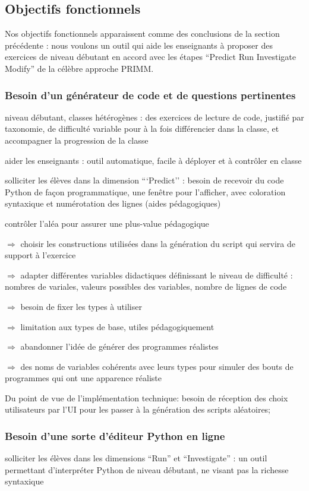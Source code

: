 \documentclass[11pt,a4paper]{article}
\begin{document}
\subsection{Objectifs fonctionnels}
Nos objectifs fonctionnels apparaissent comme des conclusions de la section précédente : nous voulons un outil qui aide les enseignants à proposer des exercices de niveau débutant en accord avec les étapes ``Predict Run Investigate Modify'' de la célèbre approche PRIMM.

\subsubsection{Besoin d'un générateur de code et de questions pertinentes}

niveau débutant, classes hétérogènes : des exercices de lecture de code, justifié par taxonomie, de difficulté variable pour à la fois différencier dans la classe, et accompagner la progression de la classe

aider les enseignants : outil automatique, facile à déployer et à contrôler en classe

solliciter les élèves dans la dimension ```Predict'' : besoin de recevoir du code Python de façon programmatique, une fenêtre pour l'afficher, avec coloration syntaxique et numérotation des lignes (aides pédagogiques)

contrôler l'aléa pour assurer une plus-value pédagogique 
\par $\Rightarrow$ choisir les constructions utilisées dans la génération du script qui servira de support à l'exercice
\par $\Rightarrow$ adapter différentes variables didactiques définissant le niveau de difficulté : nombres de variales, valeurs possibles des variables, nombre de lignes de code
\par $\Rightarrow$ besoin de fixer les types à utiliser 
\par $\Rightarrow$ limitation aux types de base, utiles pédagogiquement 
\par $\Rightarrow$ abandonner l'idée de générer des programmes réalistes
\par $\Rightarrow$ des noms de variables cohérents avec leurs types pour simuler des bouts de programmes qui ont une apparence réaliste

Du point de vue de l'implémentation technique: besoin de réception des choix utilisateurs par l'UI pour les passer à la génération des scripts aléatoires; 

\subsubsection{Besoin d'une sorte d'éditeur Python en ligne}
solliciter les élèves dans les dimensions ``Run'' et ``Investigate'' : un outil permettant d'interpréter Python de niveau débutant, ne visant pas la richesse syntaxique
\end{document}
